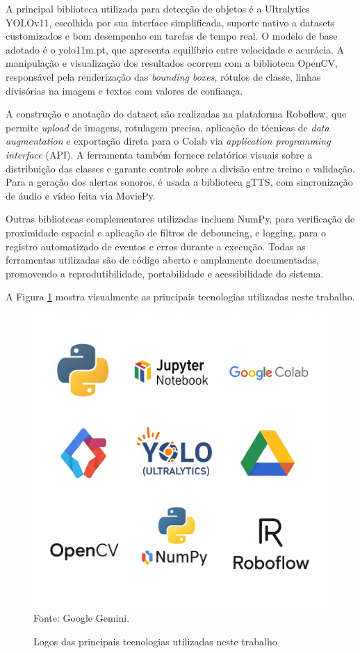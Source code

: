 A principal biblioteca utilizada para detecção de objetos é a Ultralytics YOLOv11, escolhida por sua interface simplificada, suporte nativo a datasets customizados e bom desempenho em tarefas de tempo real. O modelo de base adotado é o yolo11m.pt, que apresenta equilíbrio entre velocidade e acurácia. A manipulação e visualização dos resultados ocorrem com a biblioteca OpenCV, responsável pela renderização das \textit{bounding boxes}, rótulos de classe, linhas divisórias na imagem e textos com valores de confiança.

A construção e anotação do dataset são realizadas na plataforma Roboflow, que permite \textit{upload} de imagens, rotulagem precisa, aplicação de técnicas de \textit{data augmentation} e exportação direta para o Colab via \textit{application programming interface} (API). A ferramenta também fornece relatórios visuais sobre a distribuição das classes e garante controle sobre a divisão entre treino e validação. Para a geração dos alertas sonoros, é usada a biblioteca gTTS, com sincronização de áudio e vídeo feita via MoviePy.

Outras bibliotecas complementares utilizadas incluem NumPy, para verificação de proximidade espacial e aplicação de filtros de debouncing, e logging, para o registro automatizado de eventos e erros durante a execução. Todas as ferramentas utilizadas são de código aberto e amplamente documentadas, promovendo a reprodutibilidade, portabilidade e acessibilidade do sistema.

A Figura \ref{fg-tecnologias-logos} mostra visualmente as principais tecnologias utilizadas neste trabalho.
\begin{figure}[htbp]
  \centering
  \caption{Logos das principais tecnologias utilizadas neste trabalho}
  \includegraphics[width=0.6 \textwidth]{Figuras/tecnologias_logos.png}
  \\
  Fonte: Google Gemini.
  \label{fg-tecnologias-logos}
\end{figure}

